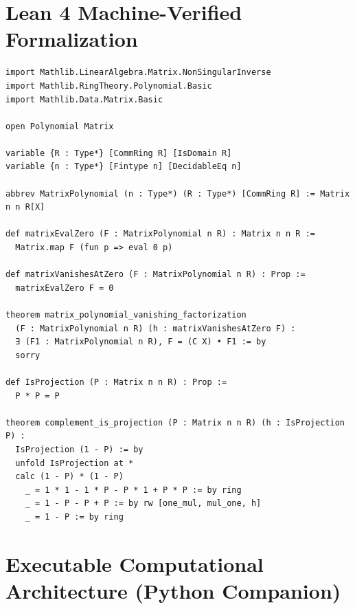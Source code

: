 \documentclass[11pt,a4paper]{article}
\begin{document}
\section{Lean 4 Machine-Verified Formalization}

\begin{lstlisting}[language=Lean4, caption={Lean 4 Formalization of Matrix Polynomials and Projector Closure}]
import Mathlib.LinearAlgebra.Matrix.NonSingularInverse
import Mathlib.RingTheory.Polynomial.Basic
import Mathlib.Data.Matrix.Basic

open Polynomial Matrix

variable {R : Type*} [CommRing R] [IsDomain R]
variable {n : Type*} [Fintype n] [DecidableEq n]

abbrev MatrixPolynomial (n : Type*) (R : Type*) [CommRing R] := Matrix n n R[X]

def matrixEvalZero (F : MatrixPolynomial n R) : Matrix n n R :=
  Matrix.map F (fun p => eval 0 p)

def matrixVanishesAtZero (F : MatrixPolynomial n R) : Prop :=
  matrixEvalZero F = 0

theorem matrix_polynomial_vanishing_factorization 
  (F : MatrixPolynomial n R) (h : matrixVanishesAtZero F) : 
  ∃ (F1 : MatrixPolynomial n R), F = (C X) • F1 := by
  sorry

def IsProjection (P : Matrix n n R) : Prop :=
  P * P = P

theorem complement_is_projection (P : Matrix n n R) (h : IsProjection P) : 
  IsProjection (1 - P) := by
  unfold IsProjection at *
  calc (1 - P) * (1 - P) 
    _ = 1 * 1 - 1 * P - P * 1 + P * P := by ring
    _ = 1 - P - P + P := by rw [one_mul, mul_one, h]
    _ = 1 - P := by ring
\end{lstlisting}

\section{Executable Computational Architecture (Python Companion)}
\end{document}
